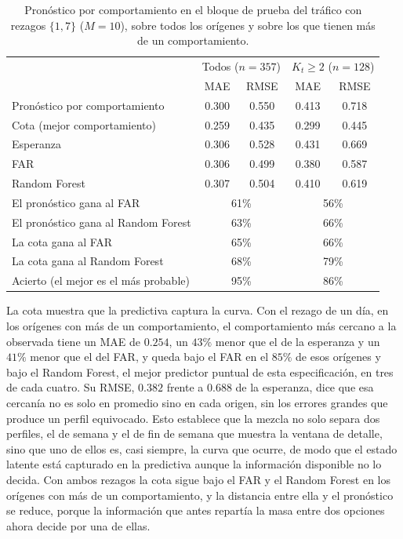 \begin{table}[H]
\centering\small
\setlength{\tabcolsep}{4pt}
\caption{Pronóstico por comportamiento en el bloque de prueba del tráfico con rezagos $\{1,7\}$ ($M = 10$), sobre todos los orígenes y sobre los que tienen más de un comportamiento.}
\label{tab:apl_pronostico_102}
\begin{tabular}{l cc cc}
\hline
& \multicolumn{2}{c}{Todos ($n = 357$)} & \multicolumn{2}{c}{$K_t \ge 2$ ($n = 128$)} \\
 & MAE & RMSE & MAE & RMSE \\
\hline
Pronóstico por comportamiento & 0.300 & 0.550 & 0.413 & 0.718 \\
Cota (mejor comportamiento) & 0.259 & 0.435 & 0.299 & 0.445 \\
Esperanza & 0.306 & 0.528 & 0.431 & 0.669 \\
FAR & 0.306 & 0.499 & 0.380 & 0.587 \\
Random Forest & 0.307 & 0.504 & 0.410 & 0.619 \\
\hline
El pronóstico gana al FAR & \multicolumn{2}{c}{61\%} & \multicolumn{2}{c}{56\%} \\
El pronóstico gana al Random Forest & \multicolumn{2}{c}{63\%} & \multicolumn{2}{c}{66\%} \\
La cota gana al FAR & \multicolumn{2}{c}{65\%} & \multicolumn{2}{c}{66\%} \\
La cota gana al Random Forest & \multicolumn{2}{c}{68\%} & \multicolumn{2}{c}{79\%} \\
Acierto (el mejor es el más probable) & \multicolumn{2}{c}{95\%} & \multicolumn{2}{c}{86\%} \\
\hline
\end{tabular}
\end{table}

La cota muestra que la predictiva captura la curva. Con el rezago de un día, en los orígenes con más de un comportamiento, el comportamiento más cercano a la observada tiene un MAE de $0.254$, un $43\%$ menor que el de la esperanza y un $41\%$ menor que el del FAR, y queda bajo el FAR en el $85\%$ de esos orígenes y bajo el Random Forest, el mejor predictor puntual de esta especificación, en tres de cada cuatro. Su RMSE, $0.382$ frente a $0.688$ de la esperanza, dice que esa cercanía no es solo en promedio sino en cada origen, sin los errores grandes que produce un perfil equivocado. Esto establece que la mezcla no solo separa dos perfiles, el de semana y el de fin de semana que muestra la ventana de detalle, sino que uno de ellos es, casi siempre, la curva que ocurre, de modo que el estado latente está capturado en la predictiva aunque la información disponible no lo decida. Con ambos rezagos la cota sigue bajo el FAR y el Random Forest en los orígenes con más de un comportamiento, y la distancia entre ella y el pronóstico se reduce, porque la información que antes repartía la masa entre dos opciones ahora decide por una de ellas.\\

